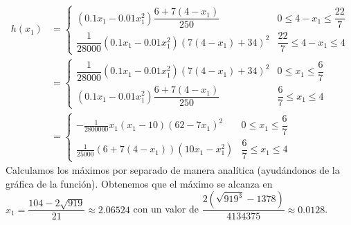 \documentclass[twoside]{article}
\begin{document}
\begin{solucion}
\begin{itemize}
\begin{align*}
h(x_1) &= \left\{\begin{array}{ll}
(0.1x_1-0.01x_1^2)\dfrac{6+7(4-x_1)}{250} & 0\leq 4-x_1 \leq \dfrac{22}{7}\\
\dfrac{1}{28000}(0.1x_1-0.01x_1^2){(7(4-x_1)+34)^2}& \dfrac{22}{7} \leq 4-x_1 \leq 4
\end{array}\right.\\
&=\left\{\begin{array}{ll}
\dfrac{1}{28000}(0.1x_1-0.01x_1^2)(7(4-x_1)+34)^2& 0 \leq x_1 \leq \dfrac{6}{7}\\
(0.1x_1-0.01x_1^2)\dfrac{6+7(4-x_1)}{250} & \dfrac{6}{7} \leq x_1 \leq 4
\end{array}\right.\\
&=\left\{\begin{array}{ll}
-\frac{1}{2800000}x_1 (x_1 - 10) (62 - 7 x_1)^2& 0 \leq x_1 \leq \dfrac{6}{7}\\
\frac{1}{25000}(6 + 7 (4 - x_1)) (10 x_1 - x_1^2) & \dfrac{6}{7} \leq x_1 \leq 4
\end{array}\right.
\end{align*}
Calculamos los máximos por separado de manera analítica (ayudándonos de la gráfica de la función). Obtenemos que el máximo se alcanza en $x_1=\dfrac{104-2\sqrt{919}}{21}\approx 2.06524$ con un valor de $\dfrac{2(\sqrt{919^3}-1378)}{4134375}\approx0.0128$.
\end{itemize}
\end{solucion}

\newpage
\end{document}
